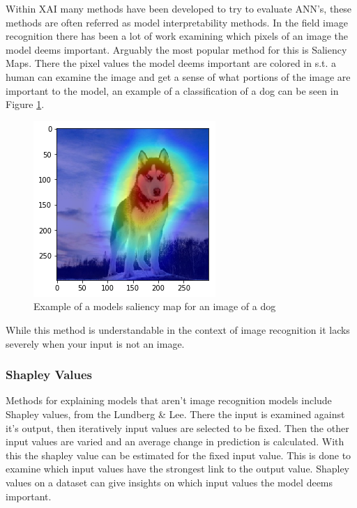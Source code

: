Within XAI many methods have been developed to try to evaluate
ANN's, these methods are often referred as model interpretability methods.
In the field image recognition there has been a lot of work examining which
pixels of an image the model deems important. Arguably the most popular
method for this is Saliency Maps\cite{Koch:saliency}. There the pixel values the model
deems important are colored in s.t. a human can examine the image and get a
sense of what portions of the image are important to the model, an example of
a classification of a dog can be seen in Figure \ref{fig:dog_saliency}.

\begin{figure}[]
  \centering
  \includegraphics[width=.5\textwidth]{graphics/dog_saliency}
  \caption{Example of a models saliency map for an image of a dog}
  \label{fig:dog_saliency}
\end{figure}

While this method is understandable in the context of image recognition it
lacks severely when your input is not an image.

\subsubsection{Shapley Values}

Methods for explaining models that aren't image recognition models include
Shapley values, from the Lundberg \& Lee\cite{LundbergL:shapley}. There the input is examined against it's output, then iteratively
input values are selected to be fixed. Then the other input values are varied and
an average change in prediction is calculated. With this the shapley value can be
estimated for the fixed input value. This is done to examine which input values have
the strongest link to the output value. Shapley values on a dataset can give insights
on which input values the model deems important.


